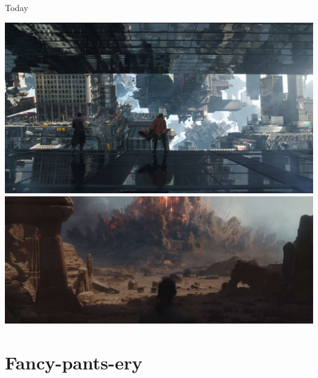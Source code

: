 \documentclass{lug}
\begin{document}
\begin{frame}{Today}
\begin{minipage}{.35\textwidth}
        \includegraphics[width=\textwidth]{graphics/dr_strange} \\
        \includegraphics[width=\textwidth]{graphics/rogue_one_boom}
    \end{minipage}
\end{frame}

\section{Fancy-pants-ery}
\end{document}
